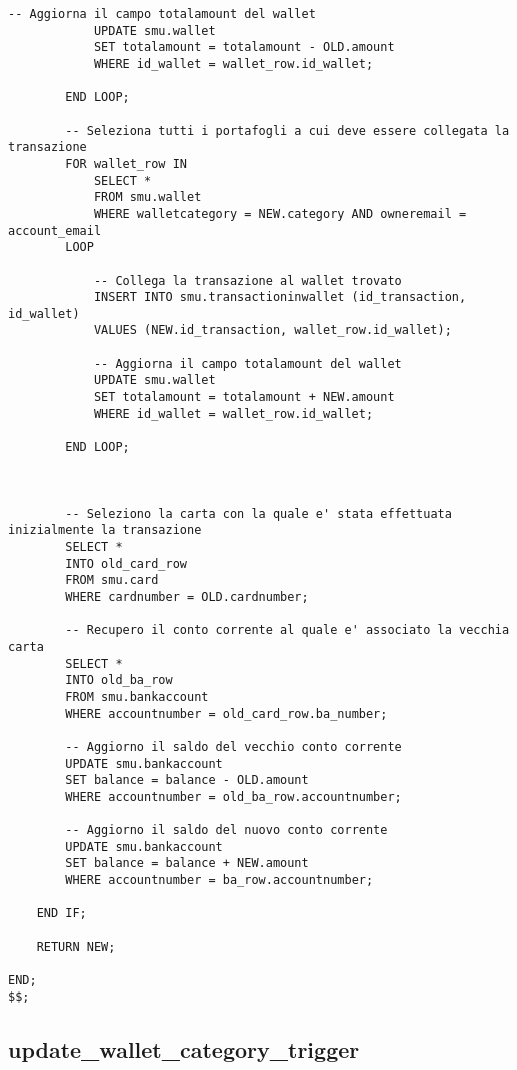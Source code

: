 \begin{lstlisting}[tabsize=2]
            -- Aggiorna il campo totalamount del wallet
            UPDATE smu.wallet
            SET totalamount = totalamount - OLD.amount
            WHERE id_wallet = wallet_row.id_wallet;

        END LOOP;

        -- Seleziona tutti i portafogli a cui deve essere collegata la transazione
        FOR wallet_row IN
            SELECT *
            FROM smu.wallet
            WHERE walletcategory = NEW.category AND owneremail = account_email
        LOOP

            -- Collega la transazione al wallet trovato
            INSERT INTO smu.transactioninwallet (id_transaction, id_wallet)
            VALUES (NEW.id_transaction, wallet_row.id_wallet);

            -- Aggiorna il campo totalamount del wallet
            UPDATE smu.wallet
            SET totalamount = totalamount + NEW.amount
            WHERE id_wallet = wallet_row.id_wallet;

        END LOOP;        



        -- Seleziono la carta con la quale e' stata effettuata inizialmente la transazione
        SELECT *
        INTO old_card_row
        FROM smu.card
        WHERE cardnumber = OLD.cardnumber;

        -- Recupero il conto corrente al quale e' associato la vecchia carta
        SELECT *
        INTO old_ba_row
        FROM smu.bankaccount
        WHERE accountnumber = old_card_row.ba_number;

        -- Aggiorno il saldo del vecchio conto corrente
        UPDATE smu.bankaccount
        SET balance = balance - OLD.amount
        WHERE accountnumber = old_ba_row.accountnumber;

        -- Aggiorno il saldo del nuovo conto corrente
        UPDATE smu.bankaccount
        SET balance = balance + NEW.amount
        WHERE accountnumber = ba_row.accountnumber;

    END IF;

    RETURN NEW;
	
END;
$$;
\end{lstlisting}

\newpage

\subsection{update\_wallet\_category\_trigger}

